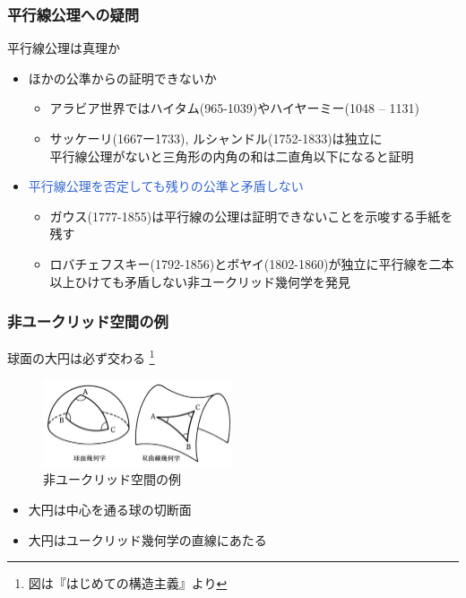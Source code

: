 \documentclass[unicode, 14pt, aspectratio=169]{beamer}
\newcommand\blfootnote[1]{%
  \begingroup
  \renewcommand\thefootnote{}\footnote{#1}%
  \addtocounter{footnote}{-1}%
  \endgroup
}
\begin{document}
\begin{frame}
  \frametitle{平行線公理への疑問}
  {\large 平行線公理は真理か}
  \begin{itemize}
  \item ほかの公準からの証明できないか
    \begin{itemize}
    \item アラビア世界ではハイタム(965-1039)やハイヤーミー(1048 – 1131)
    \item サッケーリ(1667ー1733), ルシャンドル(1752-1833)は独立に\\
      平行線公理がないと三角形の内角の和は二直角以下になると証明
    \end{itemize}
  \item \textcolor{highlight}{平行線公理を否定しても残りの公準と矛盾しない}
    \begin{itemize}
    \item ガウス(1777-1855)は平行線の公理は証明できないことを示唆する手紙を残す
    \item ロバチェフスキー(1792-1856)とボヤイ(1802-1860)が独立に平行線を二本以上ひけても矛盾しない非ユークリッド幾何学を発見
    \end{itemize}
  \end{itemize}
\end{frame}
\begin{frame}
  \frametitle{非ユークリッド空間の例}
  {\large 球面の大円は必ず交わる}
  \blfootnote{図は『はじめての構造主義』\supercite{structure}より}
  \begin{figure}
    \includegraphics[width=0.5\textwidth]{images/non-euclid.png}
    \caption{非ユークリッド空間の例}
  \end{figure}
  \begin{itemize}
  \item 大円は中心を通る球の切断面
  \item 大円はユークリッド幾何学の直線にあたる
  \end{itemize}
\end{frame}
\end{document}
